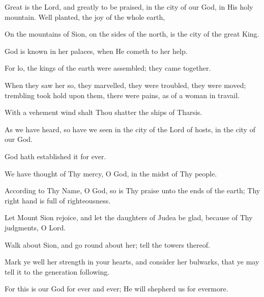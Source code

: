 Great is the Lord, and greatly to be praised, in the city of our God, in His holy mountain. Well planted, the joy of the whole earth,

On the mountains of Sion, on the sides of the north, is the city of the great King.

God is known in her palaces, when He cometh to her help.

For lo, the kings of the earth were assembled; they came together.

When they saw her so, they marvelled, they were troubled, they were moved; trembling took hold upon them, there were pains, as of a woman in travail.

With a vehement wind shalt Thou shatter the ships of Tharsis.

As we have heard, so have we seen in the city of the Lord of hosts, in the city of our God.

God hath established it for ever.

We have thought of Thy mercy, O God, in the midst of Thy people.

According to Thy Name, O God, so is Thy praise unto the ends of the earth; Thy right hand is full of righteousness.

Let Mount Sion rejoice, and let the daughters of Judea be glad, because of Thy judgments, O Lord.

Walk about Sion, and go round about her; tell the towers thereof.

Mark ye well her strength in your hearts, and consider her bulwarks, that ye may tell it to the generation following.

For this is our God for ever and ever; He will shepherd us for evermore.
